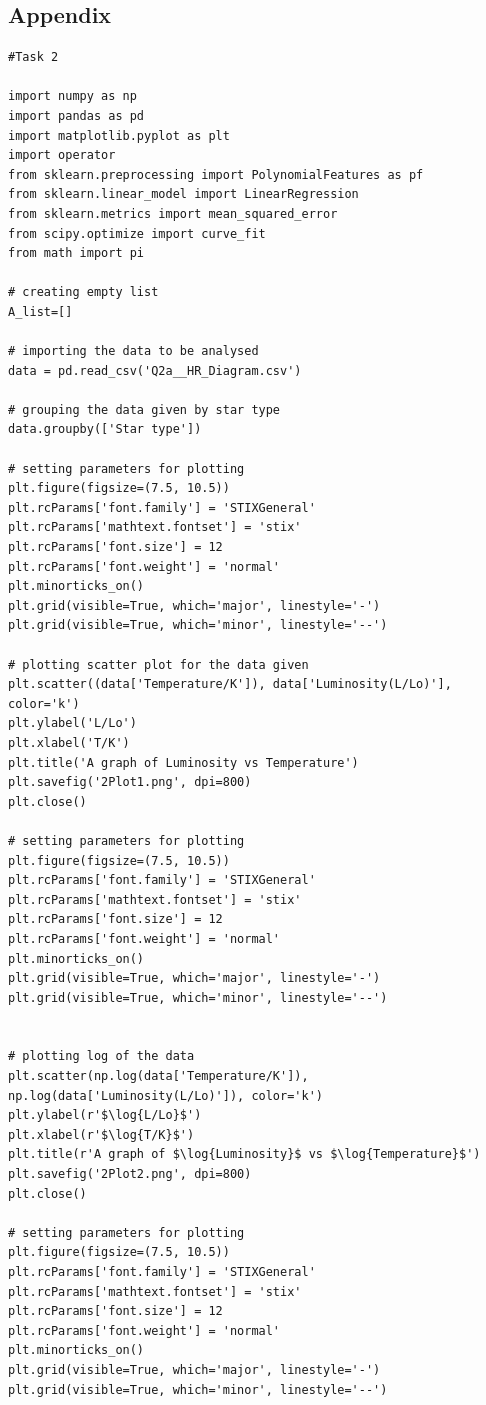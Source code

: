 \documentclass[12pt, a4paper]{article}
\begin{document}
\subsection{Appendix}
\begin{verbatim}
#Task 2

import numpy as np
import pandas as pd
import matplotlib.pyplot as plt
import operator
from sklearn.preprocessing import PolynomialFeatures as pf
from sklearn.linear_model import LinearRegression
from sklearn.metrics import mean_squared_error
from scipy.optimize import curve_fit
from math import pi

# creating empty list
A_list=[]

# importing the data to be analysed
data = pd.read_csv('Q2a__HR_Diagram.csv')

# grouping the data given by star type
data.groupby(['Star type'])

# setting parameters for plotting
plt.figure(figsize=(7.5, 10.5))
plt.rcParams['font.family'] = 'STIXGeneral'
plt.rcParams['mathtext.fontset'] = 'stix'
plt.rcParams['font.size'] = 12
plt.rcParams['font.weight'] = 'normal'
plt.minorticks_on()
plt.grid(visible=True, which='major', linestyle='-')
plt.grid(visible=True, which='minor', linestyle='--')

# plotting scatter plot for the data given
plt.scatter((data['Temperature/K']), data['Luminosity(L/Lo)'], color='k')
plt.ylabel('L/Lo')
plt.xlabel('T/K')
plt.title('A graph of Luminosity vs Temperature')
plt.savefig('2Plot1.png', dpi=800)
plt.close()

# setting parameters for plotting
plt.figure(figsize=(7.5, 10.5))
plt.rcParams['font.family'] = 'STIXGeneral'
plt.rcParams['mathtext.fontset'] = 'stix'
plt.rcParams['font.size'] = 12
plt.rcParams['font.weight'] = 'normal'
plt.minorticks_on()
plt.grid(visible=True, which='major', linestyle='-')
plt.grid(visible=True, which='minor', linestyle='--')


# plotting log of the data
plt.scatter(np.log(data['Temperature/K']), np.log(data['Luminosity(L/Lo)']), color='k')
plt.ylabel(r'$\log{L/Lo}$')
plt.xlabel(r'$\log{T/K}$')
plt.title(r'A graph of $\log{Luminosity}$ vs $\log{Temperature}$')
plt.savefig('2Plot2.png', dpi=800)
plt.close()

# setting parameters for plotting
plt.figure(figsize=(7.5, 10.5))
plt.rcParams['font.family'] = 'STIXGeneral'
plt.rcParams['mathtext.fontset'] = 'stix'
plt.rcParams['font.size'] = 12
plt.rcParams['font.weight'] = 'normal'
plt.minorticks_on()
plt.grid(visible=True, which='major', linestyle='-')
plt.grid(visible=True, which='minor', linestyle='--')


\end{verbatim}
\end{document}

